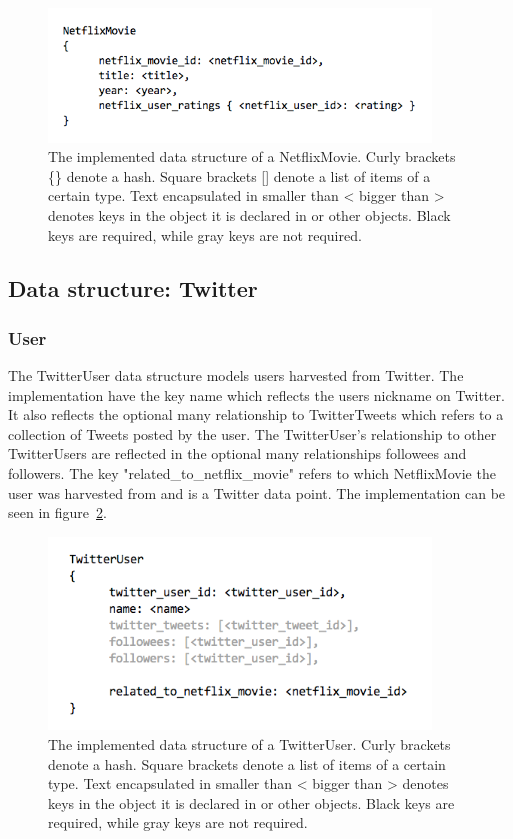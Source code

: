 	\begin{figure}[H]
	\includegraphics[width=4in]{image/datastructure-netflix-movie.png}
	\centering
	\caption[Data structure of a NetflixMovie]{The implemented data structure of a NetflixMovie. Curly brackets \{\} denote a hash. Square brackets [] denote a list of items of a certain type. Text encapsulated in smaller than < bigger than > denotes keys in the object it is declared in or other objects. Black keys are required, while gray keys are not required.}
	\label{figure:datastructure-netflix-movie}
	\end{figure}

\subsection{Data structure: Twitter}

\subsubsection{User}
The TwitterUser data structure models users harvested from Twitter. The implementation have the key name which reflects the users nickname on Twitter. It also reflects the optional many relationship to TwitterTweets which refers to a collection of Tweets posted by the user. The TwitterUser's relationship to other TwitterUsers are reflected in the optional many relationships followees and followers. The key "related\_to\_netflix\_movie" refers to which NetflixMovie the user was harvested from and is a Twitter data point. The implementation can be seen in figure~\ref{figure:datastructure-twitter-user}.

	\begin{figure}[H]
	\includegraphics[width=4in]{image/datastructure-twitter-user.png}
	\centering
	\caption{The implemented data structure of a TwitterUser. Curly brackets denote a hash. Square brackets {} denote a list of items of a certain type. Text encapsulated in smaller than < bigger than > denotes keys in the object it is declared in or other objects. Black keys are required, while gray keys are not required.}
	\label{figure:datastructure-twitter-user}
	\end{figure}

